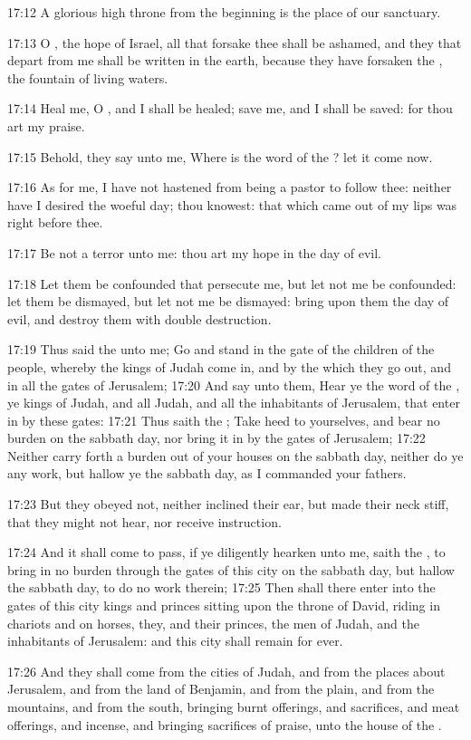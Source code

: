 17:12 A glorious high throne from the beginning is the place of our sanctuary.

17:13 O \LORD, the hope of Israel, all that forsake thee shall be ashamed, and they that depart from me shall be written in the earth, because they have forsaken the \LORD, the fountain of living waters.

17:14 Heal me, O \LORD, and I shall be healed; save me, and I shall be saved: for thou art my praise.

17:15 Behold, they say unto me, Where is the word of the \LORD? let it come now.

17:16 As for me, I have not hastened from being a pastor to follow thee: neither have I desired the woeful day; thou knowest: that which came out of my lips was right before thee.

17:17 Be not a terror unto me: thou art my hope in the day of evil.

17:18 Let them be confounded that persecute me, but let not me be confounded: let them be dismayed, but let not me be dismayed: bring upon them the day of evil, and destroy them with double destruction.

17:19 Thus said the \LORD unto me; Go and stand in the gate of the children of the people, whereby the kings of Judah come in, and by the which they go out, and in all the gates of Jerusalem; 17:20 And say unto them, Hear ye the word of the \LORD, ye kings of Judah, and all Judah, and all the inhabitants of Jerusalem, that enter in by these gates: 17:21 Thus saith the \LORD; Take heed to yourselves, and bear no burden on the sabbath day, nor bring it in by the gates of Jerusalem; 17:22 Neither carry forth a burden out of your houses on the sabbath day, neither do ye any work, but hallow ye the sabbath day, as I commanded your fathers.

17:23 But they obeyed not, neither inclined their ear, but made their neck stiff, that they might not hear, nor receive instruction.

17:24 And it shall come to pass, if ye diligently hearken unto me, saith the \LORD, to bring in no burden through the gates of this city on the sabbath day, but hallow the sabbath day, to do no work therein; 17:25 Then shall there enter into the gates of this city kings and princes sitting upon the throne of David, riding in chariots and on horses, they, and their princes, the men of Judah, and the inhabitants of Jerusalem: and this city shall remain for ever.

17:26 And they shall come from the cities of Judah, and from the places about Jerusalem, and from the land of Benjamin, and from the plain, and from the mountains, and from the south, bringing burnt offerings, and sacrifices, and meat offerings, and incense, and bringing sacrifices of praise, unto the house of the \LORD.

